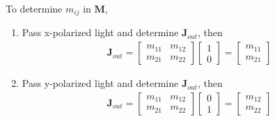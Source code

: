 \documentclass[11pt,a4paper]{article}
\numberwithin{equation}{section}
\begin{document}
To determine $m_{ij}$ in $\textbf{M}$,
\begin{enumerate}
	\item Pass x-polarized light and determine $\textbf{J}_{out}$, then 
	\begin{align*}
		\textbf{J}_{out}=
		\begin{bmatrix}
			m_{11} & m_{12}\\
			m_{21} & m_{22}
		\end{bmatrix}
		\begin{bmatrix}
			1\\
			0
		\end{bmatrix}=
	\begin{bmatrix}
		m_{11}\\
		m_{21}
	\end{bmatrix}
	\end{align*}

\item Pass y-polarized light and determine $\textbf{J}_{out}$, then 
\begin{align*}
	\textbf{J}_{out}=
	\begin{bmatrix}
		m_{11} & m_{12}\\
		m_{21} & m_{22}
	\end{bmatrix}
	\begin{bmatrix}
		0\\
		1
	\end{bmatrix}=
	\begin{bmatrix}
		m_{12}\\
		m_{22}
	\end{bmatrix}
\end{align*}
\end{enumerate}
\end{document}
